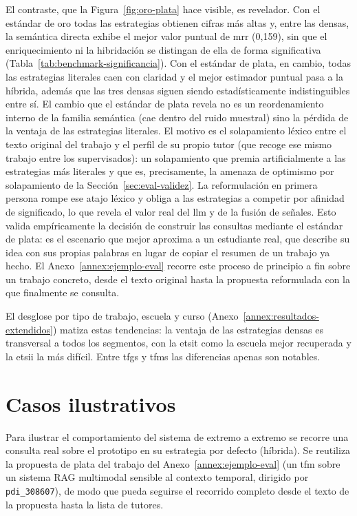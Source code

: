 El contraste, que la Figura~\ref{fig:oro-plata} hace visible, es revelador.
Con el estándar de oro todas las estrategias obtienen cifras más altas y, entre las densas, la semántica directa exhibe el mejor valor puntual de \gls{mrr} (0,159), sin que el enriquecimiento ni la hibridación se distingan de ella de forma significativa (Tabla~\ref{tab:benchmark-significancia}).
Con el estándar de plata, en cambio, todas las estrategias literales caen con claridad y el mejor estimador puntual pasa a la híbrida, además que las tres densas siguen siendo estadísticamente indistinguibles entre sí.
El cambio que el estándar de plata revela no es un reordenamiento interno de la familia semántica (cae dentro del ruido muestral) sino la pérdida de la ventaja de las estrategias literales.
El motivo es el solapamiento léxico entre el texto original del trabajo y el perfil de su propio tutor (que recoge ese mismo trabajo entre los supervisados): un solapamiento que premia artificialmente a las estrategias más literales y que es, precisamente, la amenaza de optimismo por solapamiento de la Sección~\ref{sec:eval-validez}.
La reformulación en primera persona rompe ese atajo léxico y obliga a las estrategias a competir por afinidad de significado, lo que revela el valor real del \gls{llm} y de la fusión de señales.
Esto valida empíricamente la decisión de construir las consultas mediante el estándar de plata: es el escenario que mejor aproxima a un estudiante real, que describe su idea con sus propias palabras en lugar de copiar el resumen de un trabajo ya hecho.
El Anexo~\ref{annex:ejemplo-eval} recorre este proceso de principio a fin sobre un trabajo concreto, desde el texto original hasta la propuesta reformulada con la que finalmente se consulta.

El desglose por tipo de trabajo, escuela y curso (Anexo~\ref{annex:resultados-extendidos}) matiza estas tendencias: la ventaja de las estrategias densas es transversal a todos los segmentos, con la \gls{etsit} como la escuela mejor recuperada y la \gls{etsii} la más difícil.
Entre \glspl{tfg} y \glspl{tfm} las diferencias apenas son notables.

\section{Casos ilustrativos}
\label{sec:res-casos}

Para ilustrar el comportamiento del sistema de extremo a extremo se recorre una consulta real sobre el prototipo en su estrategia por defecto (híbrida).
Se reutiliza la propuesta de plata del trabajo del Anexo~\ref{annex:ejemplo-eval} (un \gls{tfm} sobre un sistema RAG multimodal sensible al contexto temporal, dirigido por \texttt{pdi\_308607}), de modo que pueda seguirse el recorrido completo desde el texto de la propuesta hasta la lista de tutores.


